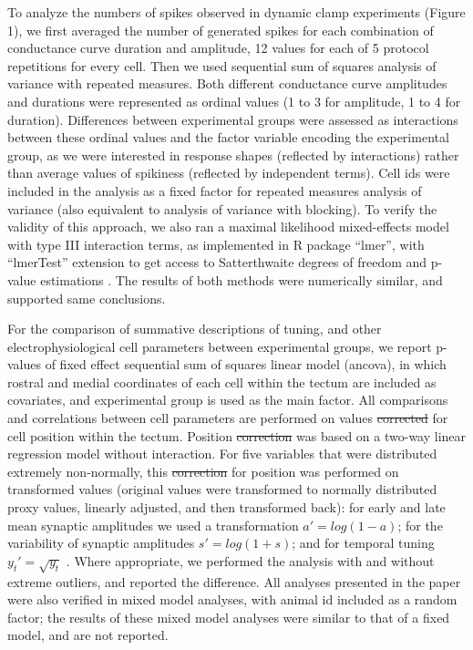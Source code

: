 \documentclass{article}
\providecommand{\DIFaddtex}[1]{{\protect\color{blue}\uwave{#1}}} %
\providecommand{\DIFdeltex}[1]{{\protect\color{red}\sout{#1}}}                      %
\providecommand{\DIFaddbegin}{} %
\providecommand{\DIFaddend}{} %
\providecommand{\DIFdelbegin}{} %
\providecommand{\DIFdelend}{} %
\providecommand{\DIFadd}[1]{\texorpdfstring{\DIFaddtex{#1}}{#1}} %
\providecommand{\DIFdel}[1]{\texorpdfstring{\DIFdeltex{#1}}{}} %
\newcommand{\DIFscaledelfig}{0.5}
\newlength{\DIFdelgraphicswidth} %
\newlength{\DIFdelgraphicsheight} %
\newcommand{\DIFaddincludegraphics}[2][]{{\color{blue}\fbox{\DIFOincludegraphics[#1]{#2}}}} %
\newcommand{\DIFdelincludegraphics}[2][]{%
\sbox{\DIFdelgraphicsbox}{\DIFOincludegraphics[#1]{#2}}%
\settoboxwidth{\DIFdelgraphicswidth}{\DIFdelgraphicsbox} %
\settoboxtotalheight{\DIFdelgraphicsheight}{\DIFdelgraphicsbox} %
\scalebox{\DIFscaledelfig}{%
\parbox[b]{\DIFdelgraphicswidth}{\usebox{\DIFdelgraphicsbox}\\[-\baselineskip] \rule{\DIFdelgraphicswidth}{0em}}\llap{\resizebox{\DIFdelgraphicswidth}{\DIFdelgraphicsheight}{%
\setlength{\unitlength}{\DIFdelgraphicswidth}%
\begin{picture}(1,1)%
\thicklines\linethickness{2pt} %
{\color[rgb]{1,0,0}\put(0,0){\framebox(1,1){}}}%
{\color[rgb]{1,0,0}\put(0,0){\line( 1,1){1}}}%
{\color[rgb]{1,0,0}\put(0,1){\line(1,-1){1}}}%
\end{picture}%
}\hspace*{3pt}}} %
} %
\DeclareRobustCommand{\DIFaddbegin}{\DIFOaddbegin \let\includegraphics\DIFaddincludegraphics} %
\DeclareRobustCommand{\DIFaddend}{\DIFOaddend \let\includegraphics\DIFOincludegraphics} %
\DeclareRobustCommand{\DIFdelbegin}{\DIFOdelbegin \let\includegraphics\DIFdelincludegraphics} %
\DeclareRobustCommand{\DIFdelend}{\DIFOaddend \let\includegraphics\DIFOincludegraphics} %
\begin{document}
To analyze the numbers of spikes observed in dynamic clamp experiments (Figure 1), we first averaged the number of generated spikes for each combination of conductance curve duration and amplitude, 12 values for each of 5 protocol repetitions for every cell. Then we used sequential sum of squares analysis of variance with repeated measures. Both different conductance curve amplitudes and durations were represented as ordinal values (1 to 3 for amplitude, 1 to 4 for duration). Differences between experimental groups were assessed as interactions between these ordinal values and the factor variable encoding the experimental group, as we were interested in response shapes (reflected by interactions) rather than average values of spikiness (reflected by independent terms). Cell ids were included in the analysis as a fixed factor for repeated measures analysis of variance (also equivalent to analysis of variance with blocking). To verify the validity of this approach, we also ran a maximal likelihood mixed-effects model with type III interaction terms, as implemented in R package “lmer”, with “lmerTest” extension to get access to Satterthwaite degrees of freedom and p-value estimations \citep{kuznetsova2017}. The results of both methods were numerically similar, and supported same conclusions.

For the comparison of summative descriptions of tuning, and other electrophysiological cell parameters between experimental groups, we report p-values of fixed effect sequential sum of squares linear model (ancova), in which rostral and medial coordinates of each cell within the tectum are included as covariates, and experimental group is used as the main factor. All comparisons and correlations between cell parameters are performed on values \DIFdelbegin \DIFdel{corrected }\DIFdelend \DIFaddbegin \DIFadd{adjusted }\DIFaddend for cell position within the tectum. Position \DIFdelbegin \DIFdel{correction }\DIFdelend \DIFaddbegin \DIFadd{adjustment }\DIFaddend was based on a two-way linear regression model without interaction. For five variables that were distributed extremely non-normally, this \DIFdelbegin \DIFdel{correction }\DIFdelend \DIFaddbegin \DIFadd{adjustment }\DIFaddend for position was performed on transformed values (original values were transformed to normally distributed proxy values, linearly adjusted, and then transformed back): for early and late mean synaptic amplitudes we used a transformation $a'=log(1-a)$; for the variability of synaptic amplitudes $s'=log(1+s)$; and for temporal tuning $y_t' = \sqrt{y_t}$ . Where appropriate, we performed the analysis with and without extreme outliers, and reported the difference. All analyses presented in the paper were also verified in mixed model analyses, with animal id included as a random factor; the results of these mixed model analyses were similar to that of a fixed model, and are not reported.

\nolinenumbers




\end{document}
